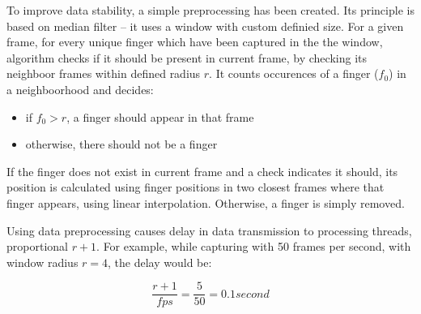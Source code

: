 To improve data stability, a simple preprocessing has been created. Its principle is based on median filter -- it uses a window with custom definied size. For a given frame, for every unique finger which have been captured in the the window, algorithm checks if it should be present in current frame, by checking its neighboor frames within defined radius $r$. It counts occurences of a finger ($f_0$) in a neighboorhood and decides:

\begin{itemize}
\item if $f_0 > r$, a finger should appear in that frame
\item otherwise, there should not be a finger
\end{itemize}

If the finger does not exist in current frame and a check indicates it should, its position is calculated using finger positions in two closest frames where that finger appears, using linear interpolation. Otherwise, a finger is simply removed.

Using data preprocessing causes delay in data transmission to processing threads, proportional $r+1$. For example, while capturing with 50 frames per second, with window radius $r=4$, the delay would be:

$$ \frac{r+1}{fps} = \frac{5}{50} = 0.1 second $$
